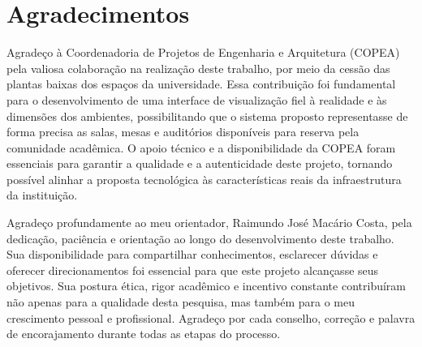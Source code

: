 \chapter*{Agradecimentos}


Agradeço à Coordenadoria de Projetos de Engenharia e Arquitetura (COPEA) pela valiosa colaboração na realização deste trabalho, por meio da cessão das plantas baixas dos espaços da universidade. Essa contribuição foi fundamental para o desenvolvimento de uma interface de visualização fiel à realidade e às dimensões dos ambientes, possibilitando que o sistema proposto representasse de forma precisa as salas, mesas e auditórios disponíveis para reserva pela comunidade acadêmica. O apoio técnico e a disponibilidade da COPEA foram essenciais para garantir a qualidade e a autenticidade deste projeto, tornando possível alinhar a proposta tecnológica às características reais da infraestrutura da instituição.

Agradeço profundamente ao meu orientador, Raimundo José Macário Costa, pela dedicação, paciência e orientação ao longo do desenvolvimento deste trabalho. Sua disponibilidade para compartilhar conhecimentos, esclarecer dúvidas e oferecer direcionamentos foi essencial para que este projeto alcançasse seus objetivos. Sua postura ética, rigor acadêmico e incentivo constante contribuíram não apenas para a qualidade desta pesquisa, mas também para o meu crescimento pessoal e profissional. Agradeço por cada conselho, correção e palavra de encorajamento durante todas as etapas do processo.

\pagebreak